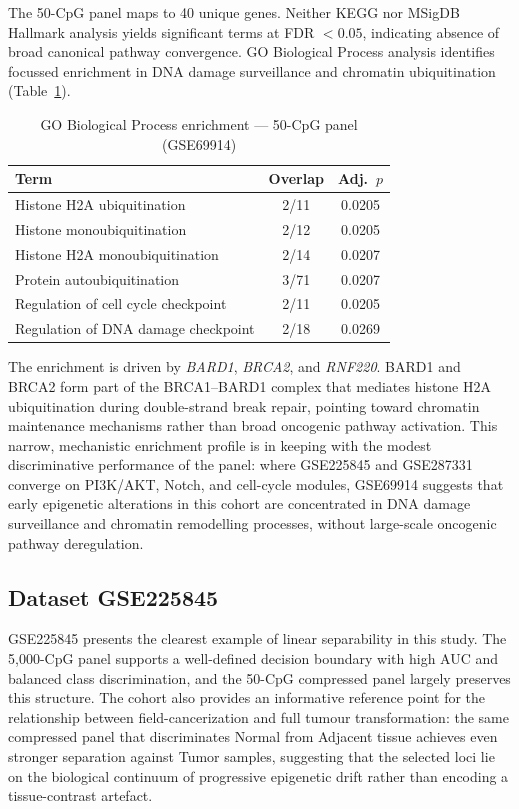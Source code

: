 The 50-CpG panel maps to 40 unique genes. Neither KEGG
nor MSigDB Hallmark analysis yields significant terms at
FDR $< 0.05$, indicating absence of broad canonical
pathway convergence. GO Biological Process analysis
identifies focussed enrichment in DNA damage surveillance
and chromatin ubiquitination (Table~\ref{tab:gse69914_go}).

\begin{table}[H]
\centering
\caption{GO Biological Process enrichment — 50-CpG panel
         (GSE69914)}
\label{tab:gse69914_go}
\begin{tabular}{lcc}
\toprule
Term & Overlap & Adj.\ $p$ \\
\midrule
Histone H2A ubiquitination          & 2/11 & 0.0205 \\
Histone monoubiquitination          & 2/12 & 0.0205 \\
Histone H2A monoubiquitination      & 2/14 & 0.0207 \\
Protein autoubiquitination          & 3/71 & 0.0207 \\
Regulation of cell cycle checkpoint & 2/11 & 0.0205 \\
Regulation of DNA damage checkpoint & 2/18 & 0.0269 \\
\bottomrule
\end{tabular}
\end{table}

The enrichment is driven by \textit{BARD1},
\textit{BRCA2}, and \textit{RNF220}. BARD1 and BRCA2
form part of the BRCA1--BARD1 complex that mediates
histone H2A ubiquitination during double-strand break
repair, pointing toward chromatin maintenance mechanisms
rather than broad oncogenic pathway activation. This
narrow, mechanistic enrichment profile is in keeping with
the modest discriminative performance of the panel: where
GSE225845 and GSE287331 converge on PI3K/AKT, Notch, and
cell-cycle modules, GSE69914 suggests that early
epigenetic alterations in this cohort are concentrated in
DNA damage surveillance and chromatin remodelling
processes, without large-scale oncogenic pathway
deregulation.

\subsection{Dataset GSE225845}
\label{sec:results_gse225845}

GSE225845 presents the clearest example of linear
separability in this study. The 5,000-CpG panel supports a
well-defined decision boundary with high AUC and balanced
class discrimination, and the 50-CpG compressed panel largely
preserves this structure. The cohort also provides an
informative reference point for the relationship between
field-cancerization and full tumour transformation: the same
compressed panel that discriminates Normal from Adjacent
tissue achieves even stronger separation against Tumor
samples, suggesting that the selected loci lie on the
biological continuum of progressive epigenetic drift rather
than encoding a tissue-contrast artefact.

